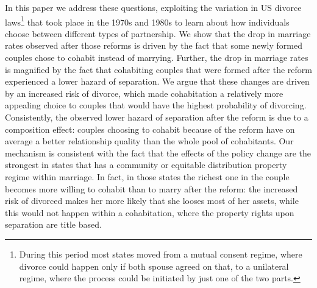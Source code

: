 \documentclass[12pt]{article}
\numberwithin{table}{section}
\begin{document}
In this paper we address these questions, exploiting the variation in US divorce laws\footnote{During this period most states moved from a mutual consent regime, where divorce could happen only if both spouse agreed on that, to a unilateral regime, where the process could be initiated by just one of the two parts.} that took place in the 1970s and 1980s to learn about how individuals choose between different types of partnership. We show that the drop in marriage rates observed after those reforms is driven by the fact that some newly formed couples chose to cohabit instead of marrying. Further, the drop in marriage rates is magnified by the fact that cohabiting couples that were formed after the reform experienced a lower hazard of separation. We argue that these changes are driven by an increased risk of divorce, which made cohabitation a relatively more appealing choice to couples that would have the highest probability of divorcing. Consistently, the observed lower hazard of separation after the reform is due to a composition effect: couples choosing to cohabit because of the reform have on average a better relationship quality than the whole pool of cohabitants. Our mechanism is consistent with the fact that the effects of the policy change are the strongest in states that has a community or equitable distribution property regime within marriage. In fact, in those states the richest one in the couple becomes more willing to cohabit than to marry after the reform: the increased risk of divorced makes her more likely that she looses most of her assets, while this would not happen within a cohabitation, where the property rights upon separation are title based. 
\end{document}
